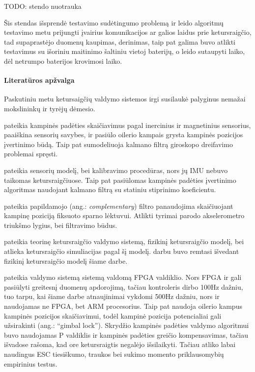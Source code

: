 \documentclass[12pt, a4paper, lithuanian, final]{article}
\begin{document}
TODO: stendo nuotrauka
\vspace{5cm}


Šis stendas išsprendė testavimo sudėtingumo problemą ir leido algoritmų testavimo metu prijungti įvairius komunikacijos ar galios laidus prie ketursraigčio, tad supaprastėjo duomenų kaupimas, derinimas, taip pat galima buvo atlikti testavimus su išoriniu maitinimo šaltiniu vietoj baterijų, o leido sutaupyti laiko, dėl netrumpo baterijos krovimosi laiko.




\paragraph{Literatūros apžvalga}

Paskutiniu metu ketursaigčių valdymo sistemos irgi susilaukė palyginus nemažai mokslininkų ir tyrėjų dėmesio.

\cite{abyarjoo2015implementing} pateikia kampinės padėties skaičiavimus pagal inercinius ir magnetinius sensorius, paaiškina sensorių savybes, ir pasiūlo oilerio kampais grysta kampinės pozicijos įvertinimo būdą.
Taip pat sumodeliuoja kalmano filtrą giroskopo dreifavimo problemai spręsti.


\cite{kumar2004estimation} pateikia sensorių modelį, bei kalibravimo procedūras, nors jų IMU nebuvo taikomas ketursraigčiuose.
Taip pat pasiūlomas kampinės padėties įvertinimo algoritmas naudojant kalmano filtrą su statiniu stiprinimo koeficientu.

\cite{euston2008complementary} pateikia papildamojo (ang.: \textit{complementary}) filtro panaudojima skaičiuojant kampinę poziciją fiksuoto sparno lėktuvui.
Atlikti tyrimai parodo akselerometro triukšmo lygius, bei filtravimo būdus.

\cite{gibiansky2010quadcopter} pateikia teorinę ketursraigčio valdymo sistemą, fizikinį ketursraigčio modelį, bei atlieka ketursraigčio simuliacijas pagal šį modelį.
\cite{gibiansky2010quadcopter} darbu buvo remtasi išvedant fizikinį ketursraigčio modelį šiame darbe.

\cite{magnussen2011modeling} pateikia valdymo sistemą sistemą valdomą FPGA valdiklio.
Nors FPGA ir gali pasiūlyti greitesnį duomenų apdorojimą, tačiau \cite{magnussen2011modeling} kontroleris dirbo 100Hz dažniu, tuo tarpu, kai šiame darbe atnaujinimai vykdomi 500Hz dažniu, nors ir naudojamas ne FPGA, bet ARM procesorius.
Taip pat \cite{magnussen2011modeling} naudoja oilerio kampus kampinės pozicijos skaičiavimui, todėl kampinė pozicija potencialiai gali užsirakinti (ang.: "`gimbal lock"').
Skrydžio kampinės padėties valdymo algoritmui buvo naudojamas P valdiklis ir kampinės padėties greičio kompensavimas, tačiau išvadose rašoma, kad ore ketursraigtis negalėjo išsilaikyti.
Tačiau \cite{magnussen2011modeling} atliko labai naudingus ESC tiesiškumo, traukos bei sukimo momento priklausomybių empirinius testus.
\end{document}
